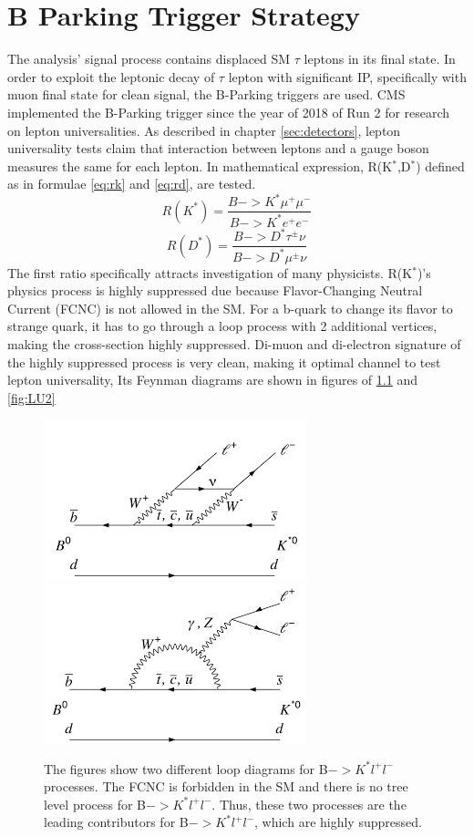 \clearpage
\chapter{B Parking Trigger Strategy}\label{sec:triggers}

The analysis' signal process contains displaced SM $\tau$ leptons in its final state. 
In order to exploit the leptonic decay of $\tau$ lepton with significant IP, specifically with muon final state for clean signal, the B-Parking triggers are used. 
CMS implemented the B-Parking trigger since the year of 2018 of Run 2 for research on lepton universalities. 
As described in chapter \ref{sec:detectors}, lepton universality tests claim that interaction between leptons and a gauge boson measures the same for each lepton. 
In mathematical expression, R(K$^{*}$,D$^{*}$) defined as in formulae \ref{eq:rk} and \ref{eq:rd}, are tested.
\begin{equation}
\label{eq:rk}
	R(K^{*})  = \frac{B->K^{*}\mu^{+}\mu^{-}}{B->K^{*}e^{+}e^{-}} 
\end{equation}
\begin{equation}
\label{eq:rd}
	R(D^{*})  = \frac{B->D^{*}\tau^{\pm}\nu}{B->D^{*}\mu^{\pm}\nu} 
\end{equation}
The first ratio specifically attracts investigation of many physicists.
R(K$^{*}$)'s physics process is highly suppressed due because Flavor-Changing Neutral Current (FCNC) is not allowed in the SM.
For a b-quark to change its flavor to strange quark, it has to go through a loop process with 2 additional vertices, making the cross-section highly suppressed.
Di-muon and di-electron signature of the highly suppressed process is very clean, making it optimal channel to test lepton universality,
Its Feynman diagrams are shown in figures of \ref{fig:LU1} and \ref{fig:LU2} 
\begin{figure}[h!]
  \caption{The figures show two different loop diagrams for B$->K^{*}l^{+}l^{-}$ processes. The FCNC is forbidden in the SM and there is no tree level process for B$->K^{*}l^{+}l^{-}$. Thus, these two processes are the leading contributors for B$->K^{*}l^{+}l^{-}$, which are highly suppressed.}
  \label{fig:LU1}
  \centering
  \includegraphics[width=0.57\linewidth]{figs/LU3.png}
  \includegraphics[width=0.57\linewidth]{figs/LU1.png}
\end{figure}
